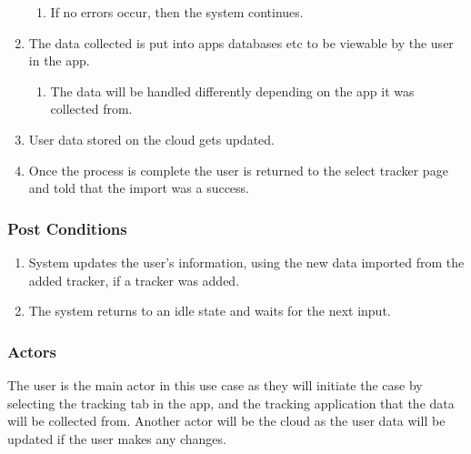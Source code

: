 \documentclass[a4paper,11pt]{article} %
\begin{document}
\begin{enumerate}
\begin{enumerate}
        \item If no errors occur, then the system continues.
    \end{enumerate}
    \item The data collected is put into apps databases etc to be viewable by the user in the app.
    \begin{enumerate}
        \item The data will be handled differently depending on the app it was collected from.
    \end{enumerate}
    \item User data stored on the cloud gets updated.
    \item Once the process is complete the user is returned to the select tracker page and told that the import was a success.
\end{enumerate}

\subsubsection*{Post Conditions}
\begin{enumerate}
    \item System updates the user’s information, using the new data imported from the added tracker, if a tracker was added.
    \item The system returns to an idle state and waits for the next input.
\end{enumerate}
 
 
\subsubsection*{Actors}
The user is the main actor in this use case as they will initiate the case by selecting the tracking tab in the app, and the tracking application that the data will be collected from. Another actor will be the cloud as the user data will be updated if the user makes any changes.
\end{document}
